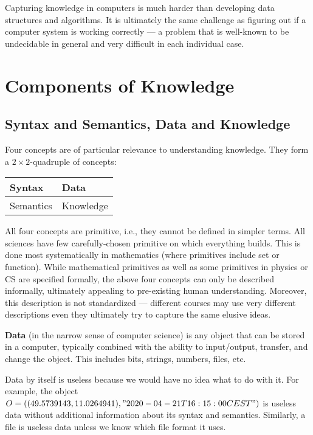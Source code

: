 Capturing knowledge in computers is much harder than developing data structures and algorithms.
It is ultimately the same challenge as figuring out if a computer system is working correctly --- a problem that is well-known to be undecidable in general and very difficult in each individual case.

\section{Components of Knowledge}

\subsection{Syntax and Semantics, Data and Knowledge}

Four concepts are of particular relevance to understanding knowledge.
They form a $2\times 2$-quadruple of concepts:

\begin{center}
\begin{tabular}{l|l}
Syntax & Data \\
\hline
Semantics & Knowledge
\end{tabular}
\end{center}

All four concepts are primitive, i.e., they cannot be defined in simpler terms.
All sciences have few carefully-chosen primitive on which everything builds.
This is done most systematically in mathematics (where primitives include set or function).
While mathematical primitives as well as some primitives in physics or CS are specified formally, the above four concepts can only be described informally, ultimately appealing to pre-existing human understanding.
Moreover, this description is not standardized --- different courses may use very different descriptions even they ultimately try to capture the same elusive ideas.

\textbf{Data} (in the narrow sense of computer science) is any object that can be stored in a computer, typically combined with the ability to input/output, transfer, and change the object.
This includes bits, strings, numbers, files, etc.

Data by itself is useless because we would have no idea what to do with it.
For example, the object $O=((49.5739143, 11.0264941), "2020-04-21T16:15:00CEST")$ is useless data without additional information about its syntax and semantics.
Similarly, a file is useless data unless we know which file format it uses.

